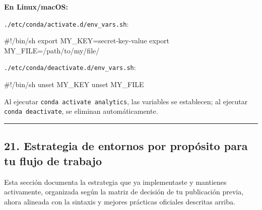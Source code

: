 \documentclass[
  doc,
  floatsintext,
  longtable,
  a4paper,
  nolmodern,
  notxfonts,
  notimes,
  12pt,
  colorlinks=true,linkcolor=blue,citecolor=blue,urlcolor=blue]{apa7}
\newenvironment{Shaded}{\begin{snugshade}}{\end{snugshade}}
\newcommand{\AttributeTok}[1]{\textcolor[rgb]{0.40,0.45,0.13}{#1}}
\newcommand{\BuiltInTok}[1]{\textcolor[rgb]{0.00,0.23,0.31}{#1}}
\newcommand{\CommentTok}[1]{\textcolor[rgb]{0.37,0.37,0.37}{#1}}
\newcommand{\FunctionTok}[1]{\textcolor[rgb]{0.28,0.35,0.67}{#1}}
\newcommand{\NormalTok}[1]{\textcolor[rgb]{0.00,0.23,0.31}{#1}}
\newcommand{\OperatorTok}[1]{\textcolor[rgb]{0.37,0.37,0.37}{#1}}
\newcommand{\StringTok}[1]{\textcolor[rgb]{0.13,0.47,0.30}{#1}}
\newcommand{\VariableTok}[1]{\textcolor[rgb]{0.07,0.07,0.07}{#1}}
\begin{document}
\textbf{En Linux/macOS:}

\begin{Shaded}
\end{Shaded}

\texttt{./etc/conda/activate.d/env\_vars.sh}:

\begin{Shaded}
\begin{Highlighting}[]
\CommentTok{\#!/bin/sh}
\BuiltInTok{export} \VariableTok{MY\_KEY}\OperatorTok{=}\StringTok{\textquotesingle{}secret{-}key{-}value\textquotesingle{}}
\BuiltInTok{export} \VariableTok{MY\_FILE}\OperatorTok{=}\NormalTok{/path/to/my/file/}
\end{Highlighting}
\end{Shaded}

\texttt{./etc/conda/deactivate.d/env\_vars.sh}:

\begin{Shaded}
\begin{Highlighting}[]
\CommentTok{\#!/bin/sh}
\BuiltInTok{unset} \VariableTok{MY\_KEY}
\BuiltInTok{unset} \VariableTok{MY\_FILE}
\end{Highlighting}
\end{Shaded}

Al ejecutar \texttt{conda\ activate\ analytics}, las variables se
establecen; al ejecutar \texttt{conda\ deactivate}, se eliminan
automáticamente.

\begin{center}\rule{0.5\linewidth}{0.5pt}\end{center}

\subsection{21. Estrategia de entornos por propósito para tu flujo de
trabajo}\label{estrategia-de-entornos-por-propuxf3sito-para-tu-flujo-de-trabajo}

Esta sección documenta la estrategia que ya implementaste y mantienes
activamente, organizada según la matriz de decisión de tu publicación
previa, ahora alineada con la sintaxis y mejores prácticas oficiales
descritas arriba.
\end{document}
